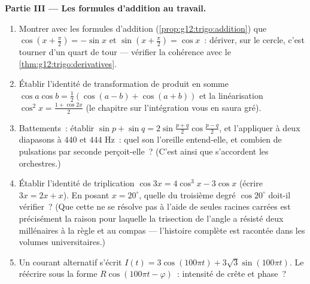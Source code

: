 \begin{problem}
\medskip
\noindent\textbf{Partie III --- Les formules d'addition au
travail.}
\begin{enumerate}[resume]
  \item Montrer avec les formules d'addition
        (\cref{prop:g12:trigo:addition}) que
        $\cos\left(x + \frac\pi2\right) = -\sin x$ et
        $\sin\left(x + \frac\pi2\right) = \cos x$~: dériver, sur le
        cercle, c'est tourner d'un quart de tour --- vérifier la
        cohérence avec le \cref{thm:g12:trigo:derivatives}.
  \item Établir l'identité de transformation de produit en somme
        $\cos a \cos b = \frac12\left(\cos(a - b) +
        \cos(a + b)\right)$ et la linéarisation
        $\cos^2 x = \frac{1 + \cos 2x}{2}$ (le chapitre sur
        l'intégration vous en saura gré).
  \item Battements~: établir
        $\sin p + \sin q = 2 \sin\frac{p + q}{2}
        \cos\frac{p - q}{2}$, et l'appliquer à deux diapasons à
        $440$ et $444$ Hz~: quel son l'oreille entend-elle, et
        combien de pulsations par seconde perçoit-elle~? (C'est
        ainsi que s'accordent les orchestres.)
  \item Établir l'identité de triplication
        $\cos 3x = 4\cos^3 x - 3\cos x$ (écrire $3x = 2x + x$). En
        posant $x = 20^\circ$, quelle  du troisième degré
        $\cos 20^\circ$ doit-il vérifier~? (Que cette  ne se
        résolve pas à l'aide de seules racines carrées est
        précisément la raison pour laquelle la trisection de l'angle
        a résisté deux millénaires à la règle et au compas ---
        l'histoire complète est racontée dans les volumes
        universitaires.)
  \item Un courant alternatif s'écrit
        $I(t) = 3\cos(100\pi t) + 3\sqrt3 \sin(100\pi t)$. Le
        réécrire sous la forme $R\cos(100\pi t - \varphi)$~:
        intensité de crête et phase~?
\end{enumerate}


\end{problem}
